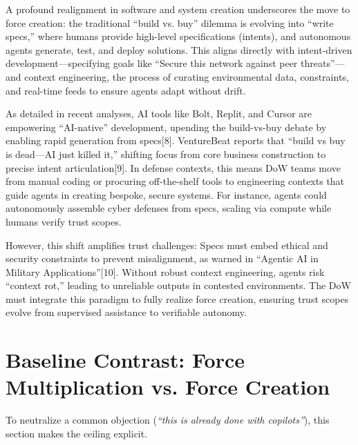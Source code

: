 \documentclass[11pt]{article}
\begin{document}
A profound realignment in software and system creation underscores the move to force creation: the traditional ``build vs. buy'' dilemma is evolving into ``write specs,'' where humans provide high-level specifications (intents), and autonomous agents generate, test, and deploy solutions. This aligns directly with intent-driven development---specifying goals like ``Secure this network against peer threats''---and context engineering, the process of curating environmental data, constraints, and real-time feeds to ensure agents adapt without drift.

As detailed in recent analyses, AI tools like Bolt, Replit, and Cursor are empowering ``AI-native'' development, upending the build-vs-buy debate by enabling rapid generation from specs[8]. VentureBeat reports that ``build vs buy is dead---AI just killed it,'' shifting focus from core business construction to precise intent articulation[9]. In defense contexts, this means DoW teams move from manual coding or procuring off-the-shelf tools to engineering contexts that guide agents in creating bespoke, secure systems. For instance, agents could autonomously assemble cyber defenses from specs, scaling via compute while humans verify trust scopes.

However, this shift amplifies trust challenges: Specs must embed ethical and security constraints to prevent misalignment, as warned in ``Agentic AI in Military Applications''[10]. Without robust context engineering, agents risk ``context rot,'' leading to unreliable outputs in contested environments. The DoW must integrate this paradigm to fully realize force creation, ensuring trust scopes evolve from supervised assistance to verifiable autonomy.


\section{Baseline Contrast: Force Multiplication vs. Force Creation}\label{baseline-contrast}

To neutralize a common objection (\emph{``this is already done with copilots''}), this section makes the ceiling explicit.
\end{document}
